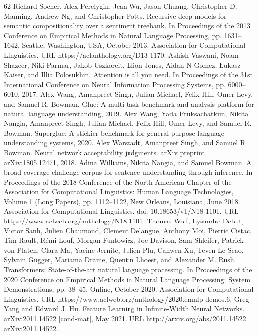 \documentclass[conference]{IEEEtran}
\begin{document}
\begin{thebibliography}{62}
 Richard Socher, Alex Perelygin, Jean Wu, Jason Chuang, Christopher D. Manning, Andrew Ng, and Christopher Potts. Recursive deep models for semantic compositionality over a sentiment treebank. In Proceedings of the 2013 Conference on Empirical Methods in Natural Language Processing, pp. 1631–1642, Seattle, Washington, USA, October 2013. Association for Computational Linguistics. URL https://aclanthology.org/D13-1170.
 Ashish Vaswani, Noam Shazeer, Niki Parmar, Jakob Uszkoreit, Llion Jones, Aidan N Gomez, Łukasz Kaiser, and Illia Polosukhin. Attention is all you need. In Proceedings of the 31st International Conference on Neural Information Processing Systems, pp. 6000–6010, 2017.
 Alex Wang, Amanpreet Singh, Julian Michael, Felix Hill, Omer Levy, and Samuel R. Bowman. Glue: A multi-task benchmark and analysis platform for natural language understanding, 2019.
 Alex Wang, Yada Pruksachatkun, Nikita Nangia, Amanpreet Singh, Julian Michael, Felix Hill, Omer Levy, and Samuel R. Bowman. Superglue: A stickier benchmark for general-purpose language understanding systems, 2020.
 Alex Warstadt, Amanpreet Singh, and Samuel R Bowman. Neural network acceptability judgments. arXiv preprint arXiv:1805.12471, 2018.
 Adina Williams, Nikita Nangia, and Samuel Bowman. A broad-coverage challenge corpus for sentence understanding through inference. In Proceedings of the 2018 Conference of the North American Chapter of the Association for Computational Linguistics: Human Language Technologies, Volume 1 (Long Papers), pp. 1112–1122, New Orleans, Louisiana, June 2018. Association for Computational Linguistics. doi: 10.18653/v1/N18-1101. URL https://www.aclweb.org/anthology/N18-1101.
 Thomas Wolf, Lysandre Debut, Victor Sanh, Julien Chaumond, Clement Delangue, Anthony Moi, Pierric Cistac, Tim Rault, Rémi Louf, Morgan Funtowicz, Joe Davison, Sam Shleifer, Patrick von Platen, Clara Ma, Yacine Jernite, Julien Plu, Canwen Xu, Teven Le Scao, Sylvain Gugger, Mariama Drame, Quentin Lhoest, and Alexander M. Rush. Transformers: State-of-the-art natural language processing. In Proceedings of the 2020 Conference on Empirical Methods in Natural Language Processing: System Demonstrations, pp. 38–45, Online, October 2020. Association for Computational Linguistics. URL https://www.aclweb.org/anthology/2020.emnlp-demos.6.
 Greg Yang and Edward J. Hu. Feature Learning in Infinite-Width Neural Networks. arXiv:2011.14522 [cond-mat], May 2021. URL http://arxiv.org/abs/2011.14522. arXiv:2011.14522.

\end{thebibliography}
\end{document}
